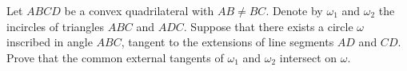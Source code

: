 Let $ABCD$ be a convex quadrilateral with $AB \neq BC$. Denote by $\omega_1$ and $\omega_2$ the incircles of triangles $ABC$ and $ADC$. Suppose that there exists a circle $\omega$ inscribed in angle $ABC$, tangent to the extensions of line segments $AD$ and $CD$. Prove that the common external tangents of $\omega_1$ and $\omega_2$ intersect on $\omega$.

